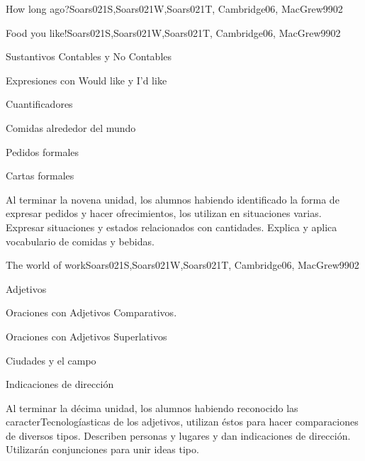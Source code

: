 \begin{syllabus}
\begin{unit}{How long ago?}{Soars021S,Soars021W,Soars021T, Cambridge06, MacGrew99}{0}{2}
\end{unit}

\begin{unit}{Food you like!}{Soars021S,Soars021W,Soars021T, Cambridge06, MacGrew99}{0}{2}
   \begin{topics}
      \item Sustantivos Contables y No Contables
      \item Expresiones con Would like y I'd like
      \item Cuantificadores
      \item Comidas alrededor del mundo
      \item Pedidos formales
      \item Cartas formales
   \end{topics}

   \begin{unitgoals}
      \item Al terminar la novena unidad, los alumnos habiendo identificado la forma de expresar pedidos y hacer ofrecimientos, los utilizan en situaciones varias. Expresar situaciones y estados relacionados con cantidades. Explica y aplica vocabulario de comidas y bebidas.
   \end{unitgoals}
\end{unit}

\begin{unit}{The world of work}{Soars021S,Soars021W,Soars021T, Cambridge06, MacGrew99}{0}{2}
   \begin{topics}
      \item Adjetivos
      \item Oraciones con Adjetivos Comparativos.
      \item Oraciones con Adjetivos Superlativos
      \item Ciudades y el campo
      \item Indicaciones de dirección
   \end{topics}

   \begin{unitgoals}
      \item Al terminar la décima unidad, los alumnos habiendo reconocido las caracterTecnologíasticas de los adjetivos, utilizan éstos para hacer comparaciones de diversos tipos. Describen personas y lugares y dan indicaciones de dirección. Utilizarán conjunciones para unir ideas tipo. 
   \end{unitgoals}

\end{unit}


\end{syllabus}
